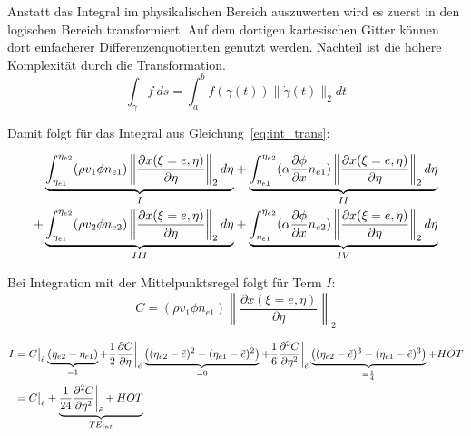 Anstatt das Integral im physikalischen Bereich auszuwerten wird es zuerst in den
logischen Bereich transformiert. Auf dem dortigen kartesischen Gitter können dort einfacherer
Differenzenquotienten genutzt werden. Nachteil ist die höhere Komplexität durch
die Transformation.
\begin{equation}
  \int_{\gamma}f\ ds=\int_a^bf(\gamma (t)) \lVert \dot{\gamma}(t)\rVert_2 dt
\end{equation}

Damit folgt für das Integral aus Gleichung~\eqref{eq:int_trans}:

\begin{align*}
  \underbrace{
  \int_{\eta_{e1}}^{\eta_{e2}} (\rho v_1 \phi n_{e1})
  \left\lVert \frac{\partial x(\xi=e, \eta)}{\partial \eta} \right\rVert_2 d\eta
  }_I
  &+ \underbrace{
  \int_{\eta_{e1}}^{\eta_{e2}} (\alpha \pder[\phi]{x} n_{e1})
  \left\lVert \frac{\partial x(\xi=e, \eta)}{\partial \eta} \right\rVert_2 d\eta
}_{II}\\
  + \underbrace{
  \int_{\eta_{e1}}^{\eta_{e2}} (\rho v_2 \phi n_{e2})
  \left\lVert \frac{\partial x(\xi=e, \eta)}{\partial \eta} \right\rVert_2 d\eta
  }_{III}
  &+ \underbrace{
  \int_{\eta_{e1}}^{\eta_{e2}} (\alpha \pder[\phi]{x} n_{e2})
  \left\lVert \frac{\partial x(\xi=e, \eta)}{\partial \eta} \right\rVert_2 d\eta
  }_{IV}
\end{align*}

Bei Integration mit der Mittelpunktsregel folgt für Term $I$:
\begin{equation*}
  C=(\rho v_1 \phi n_{e1})
  \left\lVert \frac{\partial x(\xi=e, \eta)}{\partial \eta} \right\rVert_2
\end{equation*}

\begin{align*}
  I&= C\big\vert_{\tilde{e}} \underbrace{(\etaii-\etai)}_{=1} + \frac{1}{2} \pder[C]{\eta}\bigg\vert_{\tilde{e}}
  \underbrace{\left({(\etaii-\etilde)^2-(\etai-\etilde)^2}\right)}_{=0}
  +\frac{1}{6} \frac{\partial^2 C}{\partial \eta^2}\bigg\vert_{\tilde{e}}
  \underbrace{\left({(\etaii-\etilde)^3-(\etai-\etilde)^3}\right)}_{=\frac{1}{4}} + HOT\\
  &= C \big\vert_{\tilde{e}}+ \underbrace{\frac{1}{24}  \frac{\partial^2 C}{\partial \eta^2}\bigg\vert_{\tilde{e}}+HOT}_{TE_{int}}
\end{align*}

